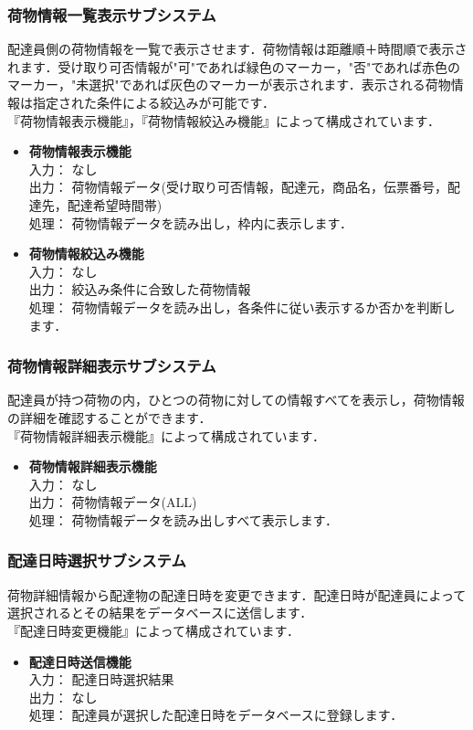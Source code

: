 \documentclass[a4j,titlepage]{jarticle}
\begin{document}
\subsubsection{荷物情報一覧表示サブシステム}
配達員側の荷物情報を一覧で表示させます．荷物情報は距離順＋時間順で表示されます．受け取り可否情報が"可"であれば緑色のマーカー，"否"であれば赤色のマーカー，"未選択"であれば灰色のマーカーが表示されます．表示される荷物情報は指定された条件による絞込みが可能です．\\
『荷物情報表示機能』，『荷物情報絞込み機能』によって構成されています．
\begin{itemize}
\item \textbf{荷物情報表示機能} \\
入力： なし \\
出力： 荷物情報データ(受け取り可否情報，配達元，商品名，伝票番号，配達先，配達希望時間帯)  \\
処理： 荷物情報データを読み出し，枠内に表示します．
\item \textbf{荷物情報絞込み機能} \\
入力： なし \\
出力： 絞込み条件に合致した荷物情報 \\
処理： 荷物情報データを読み出し，各条件に従い表示するか否かを判断します．
\end{itemize}

\subsubsection{荷物情報詳細表示サブシステム}
配達員が持つ荷物の内，ひとつの荷物に対しての情報すべてを表示し，荷物情報の詳細を確認することができます．\\
『荷物情報詳細表示機能』によって構成されています．
\begin{itemize}
\item \textbf{荷物情報詳細表示機能} \\
入力： なし \\
出力： 荷物情報データ(ALL) \\
処理： 荷物情報データを読み出しすべて表示します．
\end{itemize}


\subsubsection{配達日時選択サブシステム}
荷物詳細情報から配達物の配達日時を変更できます．配達日時が配達員によって選択されるとその結果をデータベースに送信します．\\
『配達日時変更機能』によって構成されています．
\begin{itemize}
\item \textbf{配達日時送信機能} \\
入力： 配達日時選択結果\\
出力： なし \\
処理： 配達員が選択した配達日時をデータベースに登録します．
\end{itemize}
\end{document}
